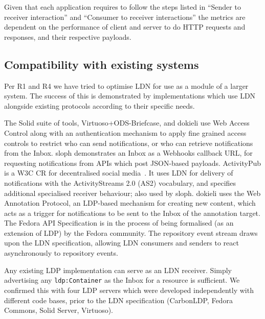 \documentclass[a4paper]{llncs}
\begin{document}
\par Given that each application requires to follow the steps listed in ``\empty Sender to receiver interaction'' and ``\empty Consumer to receiver interactions'' the metrics are dependent on the performance of client and server to do HTTP requests and responses, and their respective payloads.




                                \subsection{Compatibility with existing systems}
  \label{compatibility-with-existing-systems}



\par Per \empty R1 and \empty R4 we have tried to optimise LDN for use as a module of a larger system. The success of this is demonstrated by implementations which use LDN alongside existing protocols according to their specific needs.


\par The Solid suite of tools, Virtuoso+ODS-Briefcase, and dokieli use \empty Web Access Control along with an authentication mechanism to apply fine grained access controls to restrict who can send notifications, or who can retrieve notifications from the Inbox. sloph demonstrates an Inbox as a \empty Webhooks callback URL, for requesting notifications from APIs which post JSON-based payloads. \empty ActivityPub is a W3C CR for decentralised social media~\cite{ref-19}. It uses LDN for delivery of notifications with the \empty ActivityStreams 2.0 (AS2) vocabulary, and specifies additional specialised receiver behaviour; also used by sloph. dokieli uses the \empty Web Annotation Protocol, an LDP-based mechanism for creating new content, which acts as a trigger for notifications to be sent to the Inbox of the annotation target. The \empty Fedora API Specification is in the process of being formalised (as an extension of LDP) by the Fedora community. The repository event stream draws upon the LDN specification, allowing LDN consumers and senders to react asynchronously to repository events.


\par Any existing LDP implementation can serve as an LDN receiver. Simply advertising any {\tt ldp:Container} as the Inbox for a resource is sufficient. We confirmed this with four LDP servers which were developed independently with different code bases, prior to the LDN specification (CarbonLDP, Fedora Commons, Solid Server, Virtuoso).
\end{document}
